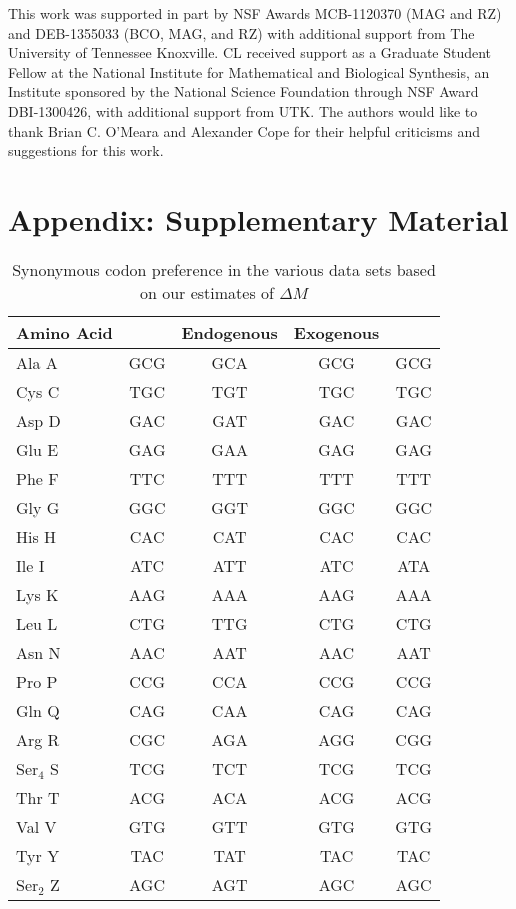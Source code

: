 This work was supported in part by NSF Awards MCB-1120370 (MAG and RZ) and DEB-1355033 (BCO, MAG, and RZ) with additional support from The University of Tennessee Knoxville. 
CL received support as a Graduate Student Fellow at the National Institute for Mathematical and Biological Synthesis, an Institute sponsored by the National Science Foundation through NSF Award DBI-1300426, with additional support from UTK. 
The authors would like to thank Brian C. O'Meara and Alexander Cope for their helpful criticisms and suggestions for this work.


%
%

\clearpage
\pagebreak
\section{Appendix: Supplementary Material}


\singlespace
\begin{table}[H]
    \centering
    \caption{Synonymous codon preference in the various data sets based on our estimates of $\Delta M$}
\begin{tabular}{  l  c  c  c  c  }
\hline
	Amino Acid & \gossypii & Endogenous & Exogenous & \kluyveri \\ \hline
	Ala A & GCG & GCA & GCG & GCG \\ 
	Cys C & TGC & TGT & TGC & TGC \\ 
	Asp D & GAC & GAT & GAC & GAC \\ 
	Glu E & GAG & GAA & GAG & GAG \\ 
	Phe F & TTC & TTT & TTT & TTT \\ 
	Gly G & GGC & GGT & GGC & GGC \\ 
	His H & CAC & CAT & CAC & CAC \\ 
	Ile I & ATC & ATT & ATC & ATA \\ 
	Lys K & AAG & AAA & AAG & AAA \\ 
	Leu L & CTG & TTG & CTG & CTG \\ 
	Asn N & AAC & AAT & AAC & AAT \\ 
	Pro P & CCG & CCA & CCG & CCG \\ 
	Gln Q & CAG & CAA & CAG & CAG \\ 
	Arg R & CGC & AGA & AGG & CGG \\ 
	Ser$_4$ S & TCG & TCT & TCG & TCG \\
	Thr T & ACG & ACA & ACG & ACG \\ 
	Val V & GTG & GTT & GTG & GTG \\ 
	Tyr Y & TAC & TAT & TAC & TAC \\ 
	Ser$_2$ Z & AGC & AGT & AGC & AGC \\ \hline
\end{tabular}
    \label{tab:codon_pref_dm}
\end{table}

